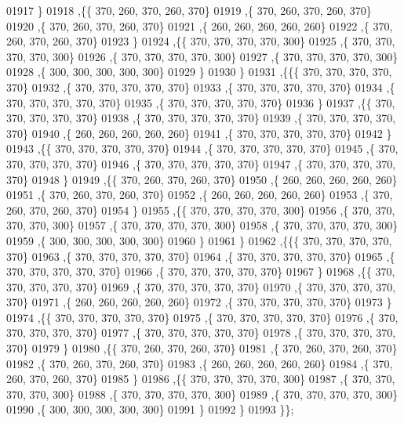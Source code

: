 \begin{DoxyCode}
01917    \}
01918   ,\{\{   370,   260,   370,   260,   370\}
01919    ,\{   370,   260,   370,   260,   370\}
01920    ,\{   370,   260,   370,   260,   370\}
01921    ,\{   260,   260,   260,   260,   260\}
01922    ,\{   370,   260,   370,   260,   370\}
01923    \}
01924   ,\{\{   370,   370,   370,   370,   300\}
01925    ,\{   370,   370,   370,   370,   300\}
01926    ,\{   370,   370,   370,   370,   300\}
01927    ,\{   370,   370,   370,   370,   300\}
01928    ,\{   300,   300,   300,   300,   300\}
01929    \}
01930   \}
01931  ,\{\{\{   370,   370,   370,   370,   370\}
01932    ,\{   370,   370,   370,   370,   370\}
01933    ,\{   370,   370,   370,   370,   370\}
01934    ,\{   370,   370,   370,   370,   370\}
01935    ,\{   370,   370,   370,   370,   370\}
01936    \}
01937   ,\{\{   370,   370,   370,   370,   370\}
01938    ,\{   370,   370,   370,   370,   370\}
01939    ,\{   370,   370,   370,   370,   370\}
01940    ,\{   260,   260,   260,   260,   260\}
01941    ,\{   370,   370,   370,   370,   370\}
01942    \}
01943   ,\{\{   370,   370,   370,   370,   370\}
01944    ,\{   370,   370,   370,   370,   370\}
01945    ,\{   370,   370,   370,   370,   370\}
01946    ,\{   370,   370,   370,   370,   370\}
01947    ,\{   370,   370,   370,   370,   370\}
01948    \}
01949   ,\{\{   370,   260,   370,   260,   370\}
01950    ,\{   260,   260,   260,   260,   260\}
01951    ,\{   370,   260,   370,   260,   370\}
01952    ,\{   260,   260,   260,   260,   260\}
01953    ,\{   370,   260,   370,   260,   370\}
01954    \}
01955   ,\{\{   370,   370,   370,   370,   300\}
01956    ,\{   370,   370,   370,   370,   300\}
01957    ,\{   370,   370,   370,   370,   300\}
01958    ,\{   370,   370,   370,   370,   300\}
01959    ,\{   300,   300,   300,   300,   300\}
01960    \}
01961   \}
01962  ,\{\{\{   370,   370,   370,   370,   370\}
01963    ,\{   370,   370,   370,   370,   370\}
01964    ,\{   370,   370,   370,   370,   370\}
01965    ,\{   370,   370,   370,   370,   370\}
01966    ,\{   370,   370,   370,   370,   370\}
01967    \}
01968   ,\{\{   370,   370,   370,   370,   370\}
01969    ,\{   370,   370,   370,   370,   370\}
01970    ,\{   370,   370,   370,   370,   370\}
01971    ,\{   260,   260,   260,   260,   260\}
01972    ,\{   370,   370,   370,   370,   370\}
01973    \}
01974   ,\{\{   370,   370,   370,   370,   370\}
01975    ,\{   370,   370,   370,   370,   370\}
01976    ,\{   370,   370,   370,   370,   370\}
01977    ,\{   370,   370,   370,   370,   370\}
01978    ,\{   370,   370,   370,   370,   370\}
01979    \}
01980   ,\{\{   370,   260,   370,   260,   370\}
01981    ,\{   370,   260,   370,   260,   370\}
01982    ,\{   370,   260,   370,   260,   370\}
01983    ,\{   260,   260,   260,   260,   260\}
01984    ,\{   370,   260,   370,   260,   370\}
01985    \}
01986   ,\{\{   370,   370,   370,   370,   300\}
01987    ,\{   370,   370,   370,   370,   300\}
01988    ,\{   370,   370,   370,   370,   300\}
01989    ,\{   370,   370,   370,   370,   300\}
01990    ,\{   300,   300,   300,   300,   300\}
01991    \}
01992   \}
01993  \}\};
\end{DoxyCode}
